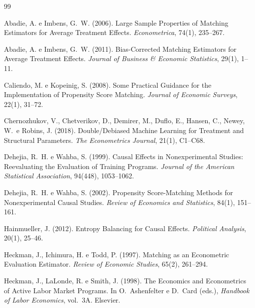 \documentclass[12pt,a4paper]{article}
\begin{document}
\begin{thebibliography}{99}

Abadie, A. e Imbens, G.~W. (2006).
\newblock Large Sample Properties of Matching Estimators for Average Treatment Effects.
\newblock \textit{Econometrica}, 74(1), 235--267.

Abadie, A. e Imbens, G.~W. (2011).
\newblock Bias-Corrected Matching Estimators for Average Treatment Effects.
\newblock \textit{Journal of Business \& Economic Statistics}, 29(1), 1--11.

Caliendo, M. e Kopeinig, S. (2008).
\newblock Some Practical Guidance for the Implementation of Propensity Score Matching.
\newblock \textit{Journal of Economic Surveys}, 22(1), 31--72.

Chernozhukov, V., Chetverikov, D., Demirer, M., Duflo, E., Hansen, C., Newey, W.\ e Robins, J. (2018).
\newblock Double/Debiased Machine Learning for Treatment and Structural Parameters.
\newblock \textit{The Econometrics Journal}, 21(1), C1--C68.

Dehejia, R.~H. e Wahba, S. (1999).
\newblock Causal Effects in Nonexperimental Studies: Reevaluating the Evaluation of Training Programs.
\newblock \textit{Journal of the American Statistical Association}, 94(448), 1053--1062.

Dehejia, R.~H. e Wahba, S. (2002).
\newblock Propensity Score-Matching Methods for Nonexperimental Causal Studies.
\newblock \textit{Review of Economics and Statistics}, 84(1), 151--161.

Hainmueller, J. (2012).
\newblock Entropy Balancing for Causal Effects.
\newblock \textit{Political Analysis}, 20(1), 25--46.

Heckman, J., Ichimura, H. e Todd, P. (1997).
\newblock Matching as an Econometric Evaluation Estimator.
\newblock \textit{Review of Economic Studies}, 65(2), 261--294.

Heckman, J., LaLonde, R. e Smith, J. (1998).
\newblock The Economics and Econometrics of Active Labor Market Programs.
\newblock In O.\ Ashenfelter e D.\ Card (eds.), \textit{Handbook of Labor Economics}, vol.~3A.
\newblock Elsevier.


\end{thebibliography}
\end{document}
